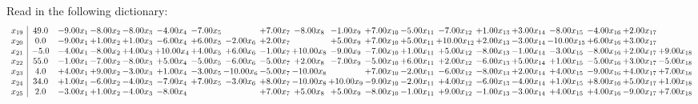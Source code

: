 \documentclass[9pt]{article}
\begin{document}
Read in the following dictionary:
\[\begin{array}{c| c c@{\hskip 2pt} c@{\hskip 2pt} c@{\hskip 2pt} c@{\hskip 2pt} c@{\hskip 2pt} c@{\hskip 2pt} c@{\hskip 2pt} c@{\hskip 2pt} c@{\hskip 2pt} c@{\hskip 2pt} c@{\hskip 2pt} c@{\hskip 2pt} c@{\hskip 2pt} c@{\hskip 2pt} c@{\hskip 2pt} c@{\hskip 2pt} c@{\hskip 2pt} c@{\hskip 2pt} }
 x_{19}   &  49.0 & -9.00 x_{1} & -8.00 x_{2} & -8.00 x_{3} & -4.00 x_{4} & -7.00 x_{5} &   & +  7.00 x_{7} & -8.00 x_{8} & -1.00 x_{9} & +  7.00 x_{10} & -5.00 x_{11} & -7.00 x_{12} & +  1.00 x_{13} & +  3.00 x_{14} & -8.00 x_{15} & -4.00 x_{16} & +  2.00 x_{17} &   \\
 x_{20}   &  0.0 & -9.00 x_{1} & +  1.00 x_{2} & +  1.00 x_{3} & -6.00 x_{4} & +  6.00 x_{5} & -2.00 x_{6} & +  2.00 x_{7} &   & +  5.00 x_{9} & +  7.00 x_{10} & +  5.00 x_{11} & + 10.00 x_{12} & +  2.00 x_{13} & -3.00 x_{14} & -10.00 x_{15} & +  6.00 x_{16} & +  3.00 x_{17} &   \\
 x_{21}   &  -5.0 & -4.00 x_{1} & -8.00 x_{2} & +  4.00 x_{3} & + 10.00 x_{4} & +  4.00 x_{5} & +  6.00 x_{6} & -1.00 x_{7} & + 10.00 x_{8} & -9.00 x_{9} & -7.00 x_{10} & +  1.00 x_{11} & +  5.00 x_{12} & -8.00 x_{13} & -1.00 x_{14} & -3.00 x_{15} & -8.00 x_{16} & +  2.00 x_{17} & +  9.00 x_{18}\\
 x_{22}   &  55.0 & -1.00 x_{1} & -7.00 x_{2} & -8.00 x_{3} & +  5.00 x_{4} & -5.00 x_{5} & -6.00 x_{6} & -5.00 x_{7} & +  2.00 x_{8} & -7.00 x_{9} & -5.00 x_{10} & +  6.00 x_{11} & +  2.00 x_{12} & -6.00 x_{13} & +  5.00 x_{14} & +  1.00 x_{15} & -5.00 x_{16} & +  3.00 x_{17} & -5.00 x_{18}\\
 x_{23}   &  4.0 & +  4.00 x_{1} & +  9.00 x_{2} & -3.00 x_{3} & +  1.00 x_{4} & -3.00 x_{5} & -10.00 x_{6} & -5.00 x_{7} & -10.00 x_{8} &   & +  7.00 x_{10} & -2.00 x_{11} & -6.00 x_{12} & -8.00 x_{13} & +  2.00 x_{14} & +  4.00 x_{15} & -9.00 x_{16} & +  4.00 x_{17} & +  7.00 x_{18}\\
 x_{24}   &  34.0 & +  1.00 x_{1} & -6.00 x_{2} & -4.00 x_{3} & -7.00 x_{4} & +  7.00 x_{5} & -3.00 x_{6} & +  8.00 x_{7} & -10.00 x_{8} & + 10.00 x_{9} & -9.00 x_{10} & -2.00 x_{11} & +  4.00 x_{12} & -6.00 x_{13} & -4.00 x_{14} & +  1.00 x_{15} & +  8.00 x_{16} & +  5.00 x_{17} & +  1.00 x_{18}\\
 x_{25}   &  2.0 & -3.00 x_{1} & +  1.00 x_{2} & -4.00 x_{3} & -8.00 x_{4} &    &   & +  7.00 x_{7} & +  5.00 x_{8} & +  5.00 x_{9} & -8.00 x_{10} & -1.00 x_{11} & +  9.00 x_{12} & -1.00 x_{13} & -3.00 x_{14} & +  4.00 x_{15} & +  4.00 x_{16} & -9.00 x_{17} & +  7.00 x_{18}\\

\end{array}\]
\end{document}
